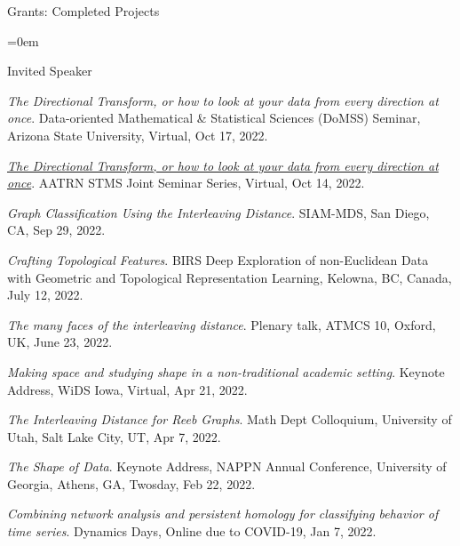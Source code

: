 \documentclass{resume} %
\begin{document}
\begin{rSection}{Grants: Completed Projects}
\begin{itemize}{}{\leftmargin=0em}

\end{itemize}
\vspace{-.1in}

\end{rSection}


%
\begin{rSection}{Invited Speaker}

\begin{etaremune}
\item\emph{The Directional Transform, or how to look at your data from every direction at once}. Data-oriented Mathematical \& Statistical Sciences (DoMSS) Seminar, Arizona State University, Virtual, Oct 17, 2022. 

\item\emph{\href{https://www.youtube.com/watch?v=_-gDBosxp2M}{The Directional Transform, or how to look at your data from every direction at once}}. AATRN STMS Joint Seminar Series, Virtual, Oct 14, 2022. 

\item\emph{Graph Classification Using the Interleaving Distance}. SIAM-MDS, San Diego, CA, Sep 29, 2022. 

\item\emph{Crafting Topological Features}. BIRS Deep Exploration of non-Euclidean Data with Geometric and Topological Representation Learning, Kelowna, BC, Canada, July 12, 2022. 

\item\emph{The many faces of the interleaving distance}. Plenary talk, ATMCS 10, Oxford, UK, June 23, 2022. 

\item\emph{Making space and studying shape in a non-traditional academic setting}. Keynote Address, WiDS Iowa, Virtual, Apr 21, 2022. 

\item\emph{The Interleaving Distance for Reeb Graphs}. Math Dept Colloquium, University of Utah, Salt Lake City, UT, Apr 7, 2022. 

\item\emph{The Shape of Data}. Keynote Address, NAPPN Annual Conference, University of Georgia, Athens, GA, Twosday, Feb 22, 2022. 

\item\emph{Combining network analysis and persistent homology for classifying behavior of time series}. Dynamics Days, Online due to COVID-19, Jan 7, 2022. 


\end{etaremune}
\end{rSection}
\end{document}

